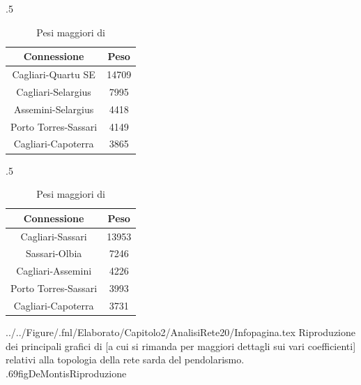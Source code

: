     \begin{table}[htb]
      \centering
      \newcommand\dimTab{.5\linewidth}
      \newcommand\sepCol{\hspace{0.5em}}
      \newcommand\sepTab{\hspace{0em}}
      \caption{Confronto con \cite{DeMontis2007} dei pesi maggiori.}
      \label{tabConfrontoPesiDeMontis}
      \begin{subtable}{\dimTab}
        \centering
        \caption{Pesi maggiori correnti.}
        \label{tabPesiCorrenti}
        \begin{tabular}{c@{\sepCol}c}
          \hline
          Connessione & Peso \\
          \hline
          Cagliari-Quartu SE & 14709 \\
          Cagliari-Selargius & 7995 \\
          Assemini-Selargius & 4418 \\
          Porto Torres-Sassari & 4149 \\
          Cagliari-Capoterra & 3865 \\
          \hline
        \end{tabular}
      \end{subtable}%
      \sepTab
      \begin{subtable}{\dimTab}
        \centering
        \caption{Pesi maggiori di \cite{DeMontis2007}}
        \label{tabPesiDeMontis}
        \begin{tabular}{c@{\sepCol}c}
          \hline
          Connessione & Peso \\
          \hline
          Cagliari-Sassari & 13953 \\
          Sassari-Olbia & 7246 \\
          Cagliari-Assemini & 4226 \\
          Porto Torres-Sassari & 3993 \\
          Cagliari-Capoterra & 3731 \\
          \hline
        \end{tabular}
      \end{subtable}
    \end{table}
    
      {../../Figure/.fnl/Elaborato/Capitolo2/AnalisiRete20/Infopagina.tex}
      {Riproduzione dei principali grafici di \protect\cite{DeMontis2007} [a cui si rimanda per maggiori dettagli sui vari coefficienti] relativi alla topologia della rete sarda del pendolarismo.}
      {.69\linewidth}{figDeMontisRiproduzione}
